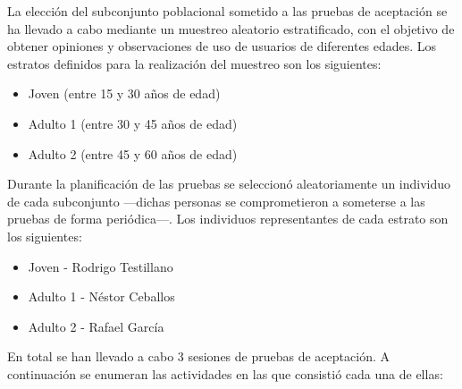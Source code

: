 La elección del subconjunto poblacional sometido a las pruebas de aceptación se ha llevado a cabo mediante un muestreo aleatorio estratificado, con el objetivo de obtener opiniones y observaciones de uso de usuarios de diferentes edades. Los estratos definidos para la realización del muestreo son los siguientes:

\begin{itemize}
\item Joven (entre 15 y 30 años de edad)
\item Adulto 1 (entre 30 y 45 años de edad)
\item Adulto 2 (entre 45 y 60 años de edad)
\end{itemize}

Durante la planificación de las pruebas se seleccionó aleatoriamente un individuo de cada subconjunto ---dichas personas se comprometieron a someterse a las pruebas de forma periódica---. Los individuos representantes de cada estrato son los siguientes:

\begin{itemize}
\item Joven - Rodrigo Testillano
\item Adulto 1 - Néstor Ceballos
\item Adulto 2 - Rafael García
\end{itemize}


En total se han llevado a cabo 3 sesiones de pruebas de aceptación. A continuación se enumeran las actividades en las que consistió cada una de ellas:

